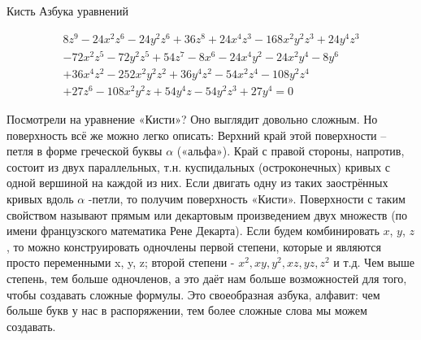 \begin{surferPage}{Кисть}%
\singlespacing
Азбука уравнений

{\scriptsize\begin{gather*}
8z^9-24x^2z^6-24y^2z^6+36z^8+24x^4z^3-168x^2y^2z^3+24y^4z^3\\
-72x^2z^5-72y^2z^5+54z^7-8x^6-24x^4y^2-24x^2y^4-8y^6\\
+ 36x^4z^2-252x^2y^2z^2+36y^4z^2- 54x^2z^4-108y^2z^4\\
 + 27z^6-108x^2y^2z + 54y^4z-54y^2z^3 + 27y^4 = 0
\end{gather*}}

Посмотрели на уравнение «Кисти»? Оно выглядит довольно сложным. Но поверхность всё же можно легко описать: Верхний край этой поверхности – петля в форме греческой буквы $\alpha$ («альфа»). Край с правой стороны, напротив, состоит из двух параллельных, т.н. куспидальных (остроконечных) кривых с одной вершиной на каждой из них. Если двигать одну из таких заострённых кривых вдоль $\alpha$ -петли, то получим поверхность «Кисти». Поверхности с таким свойством называют прямым или декартовым произведением двух множеств (по имени французского математика Рене Декарта).
%
Если будем комбинировать  $x$, $y$, $z$, то можно конструировать одночлены первой степени, которые и являются просто переменными x, y, z; второй степени - $x^2, xy, y^2, xz, yz, z^2$ и т.д. Чем выше степень, тем больше одночленов, а это даёт нам больше возможностей для того, чтобы создавать сложные формулы. Это своеобразная азбука, алфавит: чем больше букв у нас в распоряжении, тем более сложные слова мы можем создавать.
\end{surferPage}
